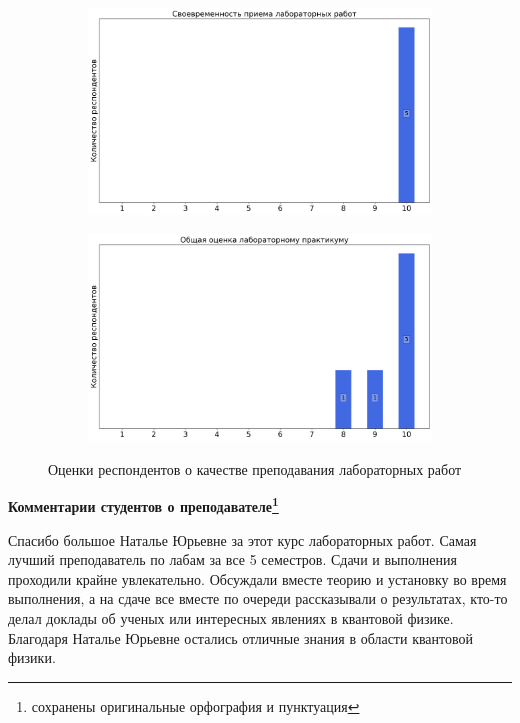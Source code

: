 \begin{figure}[H]
\begin{subfigure}[b]{0.45\textwidth}
                \end{subfigure}
                \begin{subfigure}[b]{0.45\textwidth}
                    \centering
                    \includegraphics[width=\textwidth]{images/3 course/Общая физика - квантовая физика/labniks-marks-Зубович Н.Ю.-2.png}
                \end{subfigure}
                \begin{subfigure}[b]{0.45\textwidth}
                    \centering
                    \includegraphics[width=\textwidth]{images/3 course/Общая физика - квантовая физика/labniks-marks-Зубович Н.Ю.-3.png}
                \end{subfigure}	
                \caption{Оценки респондентов о качестве преподавания лабораторных работ}
            \end{figure}

            \textbf{Комментарии студентов о преподавателе\protect\footnote{сохранены оригинальные орфография и пунктуация}}
                \begin{commentbox} 
                    Спасибо большое Наталье Юрьевне за этот курс лабораторных работ. Самая лучший преподаватель по лабам за все 5 семестров. Сдачи и выполнения проходили крайне увлекательно. Обсуждали вместе теорию и установку во время выполнения, а на сдаче все вместе по очереди рассказывали о результатах, кто-то делал доклады об ученых или интересных явлениях в квантовой физике. Благодаря Наталье Юрьевне остались отличные знания в области квантовой физики. 
                \end{commentbox} 
            
